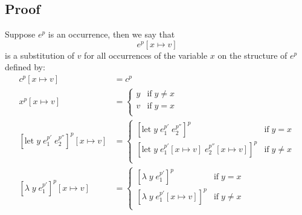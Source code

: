 \documentclass[../../master.tex]{subfiles}
\begin{document}
\subsection{Proof}
\begin{definition}[Substitutions]
	Suppose $e^p$ is an occurrence, then we say that
	$$e^p[x\mapsto v]$$
	is a substitution of $v$ for all occurrences of the variable $x$ on the structure of $e^p$ defined by:
	\begin{align*}
		c^p[x\mapsto v]&=c^p\\
		x^p[x\mapsto v]&=	\left\{\begin{matrix}
									y & \mbox{if}\;y \neq x\\ 
									v & \mbox{if}\;y = x\\ 
								\end{matrix}\right.\\
		[\mbox{let}\;y\;e_1^{p'}\;e_2^{p''}]^p[x\mapsto v]&=	\left\{\begin{matrix}
																[\mbox{let}\;y\;e_1^{p'}\;e_2^{p''}]^p & \mbox{if}\;y = x\\ 
																[\mbox{let}\;y\;e_1^{p'}[x\mapsto v]\;e_2^{p''}[x\mapsto v]]^p & \mbox{if}\;y \neq x\\ 
															\end{matrix}\right.\\
		[\lambda\;y\;e_1^{p'}]^p[x\mapsto v]&=	\left\{\begin{matrix}
																[\lambda\;y\;e_1^{p'}]^p & \mbox{if}\;y = x\\ 
																[\lambda\;y\;e_1^{p'}[x\mapsto v]]^p & \mbox{if}\;y \neq x\\ 
															\end{matrix}\right.\\
	\end{align*}

\end{definition}
\end{document}
